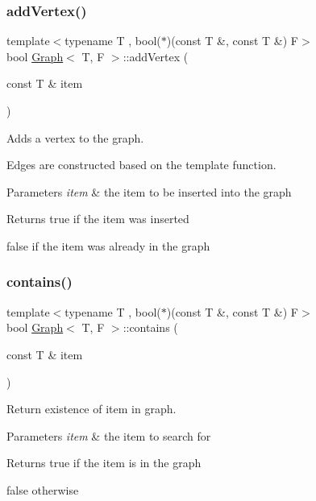 \subsubsection{\texorpdfstring{add\+Vertex()}{addVertex()}}
{\footnotesize\ttfamily template$<$typename T , bool($\ast$)(const T \&, const T \&) F$>$ \\
bool \hyperlink{class_graph}{Graph}$<$ T, F $>$\+::add\+Vertex (\begin{DoxyParamCaption}\item[{const T \&}]{item }\end{DoxyParamCaption})}



Adds a vertex to the graph. 

Edges are constructed based on the template function.


\begin{DoxyParams}{Parameters}
{\em item} & the item to be inserted into the graph \\
\hline
\end{DoxyParams}
\begin{DoxyReturn}{Returns}
true if the item was inserted 

false if the item was already in the graph 
\end{DoxyReturn}
\mbox{\label{class_graph_a9e88e1fec0b85da66ea58a39a4fdc652}} 
\subsubsection{\texorpdfstring{contains()}{contains()}}
{\footnotesize\ttfamily template$<$typename T , bool($\ast$)(const T \&, const T \&) F$>$ \\
bool \hyperlink{class_graph}{Graph}$<$ T, F $>$\+::contains (\begin{DoxyParamCaption}\item[{const T \&}]{item }\end{DoxyParamCaption})}



Return existence of item in graph. 


\begin{DoxyParams}{Parameters}
{\em item} & the item to search for \\
\hline
\end{DoxyParams}
\begin{DoxyReturn}{Returns}
true if the item is in the graph 

false otherwise 
\end{DoxyReturn}
\mbox{\label{class_graph_aaab69d9804f13918c7fe260b86a40d91}} 

